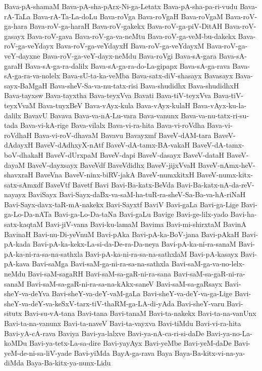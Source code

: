 {Bava-pA-shamaM
Bava-pA-sha-pArx-Ni-ga-Letatx
Bava-pA-sha-pa-ri-vudu
Bava-rA-TaLa
Bava-rA-Ta-La-doLu
Bava-roVga
Bava-roVgaH
Bava-roVgaM
Bava-roV-ga-hara
Bava-roV-ga-haraH
Bava-roV-gakekx
Bava-roV-ga-piV-DitAH
Bava-roV-gasayx
Bava-roV-gava
Bava-roV-ga-va-neMtu
Bava-roV-ga-veM-bu-dakekx
Bava-roV-ga-veYdayx
Bava-roV-ga-veYdayxH
Bava-roV-ga-veYdayxM
Bava-roV-ga-veY-dayxne
Bava-roV-ga-veY-dayx-neMdu
Bava-roVgi
Bava-sA-gara
Bava-sA-garaH
Bava-sA-ga-ra-dalilx
Bava-sA-ga-ra-do-La-gipapx
Bava-sA-ga-rava
Bava-sA-ga-ra-va-nolelx
Bava-sU-ta-ka-veMba
Bava-satx-diV-shasayx
Bavasayx
Bava-sayx-BaMgaH
Bava-sheV-Sa-va-nu-tatx-risi
Bava-shudidhx
Bava-shudidhxH
Bava-tayxsw
Bava-tayxtha
Bava-teyxVva
Bavati
Bava-tiV-teyxVva
Bava-tiV-teyxVvaM
Bava-tuyxBeV
Bava-vAyx-kula
Bava-vAyx-kulaH
Bava-vAyx-ku-la-dalilx
BavavU
Bavava
Bava-va-nA-Lu-vara
Bava-vanunx
Bava-va-nu-tatx-ri-su-tada
Bava-vi-kA-rige
Bava-vilalx
Bava-vi-ra-hita
Bava-vi-roVdha
Bava-vi-roVdhaH
Bava-vi-roV-dhavaM
Bavavu
Bavayxmf
BaveV-dAM-tara
BaveV-dAdayxH
BaveV-dAdhxyX-nAtf
BaveV-dA-tamx-BA-vakaH
BaveV-dA-tamx-boV-dhakaH
BaveV-dUrxpaM
BaveV-dapi
BaveV-dasayx
BaveV-dataH
BaveV-dayaM
BaveV-dayxsayx
BaveVdf
BaveVdidhx
BaveV-jijxVvaH
BaveV-nAmx-heV-shavxraH
BaveVna
BaveV-ninx-biRV-jakA
BaveV-numxkitxH
BaveV-numx-kitx-satx-sAmxdf
BaveVtf
Bavetf
Bavi
Bavi-Ba-katx-BeVda
Bavi-Ba-katx-nA-da-reV-nayayx
BaviSayx
Bavi-Sayx-daBx-va-saM-ha-tuR-ra-sheV-Sa-Ba-va-hA-riNaH
Bavi-Sayx-davx-taR-mA-nakekx
Bavi-Sayxtf
BaviV
Bavi-gaLa
Bavi-ga-Lige
Bavi-ga-Lo-Da-nATa
Bavi-ga-Lo-Da-taNa
Bavi-gaLu
Bavige
Bavi-ge-lilx-yado
Bavi-ha-satx-kaqtaM
Bavi-jiV-vana
Bavi-ku-lamaM
Bavima
Bavi-mi-shirxtaM
BavinA
BavinaH
Bavi-nu-Di-yeVnuM
Bavi-pAka
Bavi-pA-ka-BoV-jana
Bavi-pAkaH
Bavi-pA-kada
Bavi-pA-ka-kekx-La-si-da-De-ra-Da-neya
Bavi-pA-ka-ni-ra-sanaM
Bavi-pA-ka-ni-ra-sa-na-sathxla
Bavi-pA-ka-ni-ra-sa-na-sathxlaM
Bavi-pA-kasayx
Bavi-pA-kava
Bavi-saMga
Bavi-saM-ga-ni-ra-sa-na-sathxla
Bavi-saM-ga-va-no-lelx-neMdu
Bavi-saM-sagaRH
Bavi-saM-sa-gaR-ni-ra-sana
Bavi-saM-sa-gaR-ni-ra-sanaM
Bavi-saM-sa-gaR-ni-ra-sa-na-kAkx-saneV
Bavi-saM-sa-gaRsayx
Bavi-sheY-va-deYva
Bavi-sheY-va-deY-vaM-gaLa
Bavi-sheY-va-deY-va-ga-Lige
Bavi-sheY-va-deY-va-keSxV-tarx-tiV-thaRM-ga-LA-di-yAda
Bavi-sheY-varu
Bavi-situtx
Bavi-su-vA-tana
Bavi-tana
Bavi-tanaM
Bavi-ta-nakekx
Bavi-ta-na-vanUnx
Bavi-ta-na-vanunx
Bavi-ta-naveV
Bavi-ta-vayxva
Bavi-tiMdu
Bavi-vi-ra-hita
Bavi-yA-cA-rava
Baviya
Bavi-ya-lalxve
Bavi-ya-nA-ca-ri-si-daDe
Bavi-ya-no-La-koMDu
Bavi-ya-tetx-La-sa-dire
Bavi-yayAyx
Bavi-yeMbe
Bavi-yeM-daDe
Bavi-yeM-de-ni-sa-liV-yade
Bavi-yiMda
BayA-ga-rava
Baya
Baya-Ba-kitx-vi-na-ya-diMda
Baya-Ba-kitx-ya-nunx-Lidu
}

